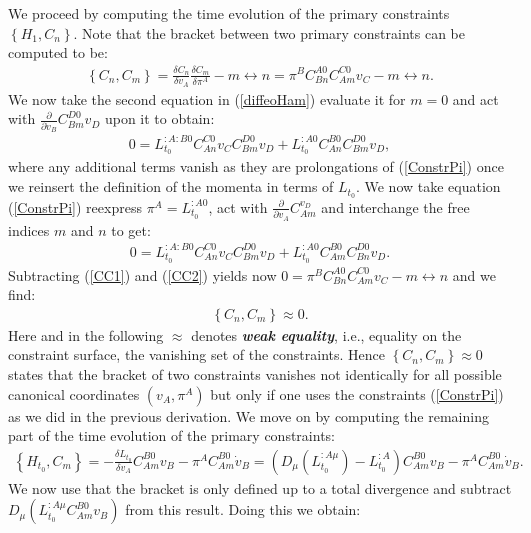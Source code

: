 We proceed by computing the time evolution of the primary constraints $\left \{ H_1, C_n \right \}$. Note that the bracket between two primary constraints can be computed to be: 
\begin{align}
    \left \{C_n, C_m \right \} = \frac{\delta C_n}{\delta v_A}\frac{\delta C_m}{\delta \pi^A} - m \leftrightarrow n = \pi^B C_{Bn}^{A0}C_{Am}^{C0} v_C - m \leftrightarrow n .
\end{align}
We now take the second equation in (\ref{diffeoHam}) evaluate it for $m=0$ and act with $\frac{\partial}{\partial \dot{v}_B}C_{Bm}^{D0}v_D$ upon it to obtain: 
\begin{align}\label{CC1}
    0 = L_{t_0}^{:A:B0}C_{An}^{C0}v_CC_{Bm}^{D0}v_D + L_{t_0}^{:A0}C_{An}^{B0}C_{Bm}^{D0}v_D,
\end{align}
where any additional terms vanish as they are prolongations of (\ref{ConstrPi}) once we reinsert the definition of the momenta in terms of $L_{t_0}$. We now take equation (\ref{ConstrPi}) reexpress $\pi^A = L_{t_0}^{:A0}$, act with $\frac{\partial}{\partial v_A}C_{Am}^{v_D}$ and interchange the free indices $m$ and $n$ to get:
\begin{align}\label{CC2}
    0 = L_{t_0}^{:A:B0}C_{An}^{C0}v_CC_{Bm}^{D0}v_D + L_{t_0}^{:A0}C_{Am}^{B0}C_{Bn}^{D0}v_D.
\end{align}
Subtracting (\ref{CC1}) and (\ref{CC2}) yields now $0=\pi^B C_{Bn}^{A0}C_{Am}^{C0} v_C - m \leftrightarrow n$ and we find:
\begin{align}
    \left \{C_n, C_m \right \} \approx 0.
\end{align}
Here and in the following $\approx$ denotes \textit{\textbf{weak equality}}, i.e., equality on the constraint surface, the vanishing set of the constraints. Hence $\left \{C_n, C_m \right \} \approx 0$ states that the bracket of two constraints vanishes not identically for all possible canonical coordinates $(v_A,\pi^A)$ but only if one uses the constraints (\ref{ConstrPi}) as we did in the previous derivation. We move on by computing the remaining part of the time evolution of the primary constraints:
\begin{align}
    \left \{H_{t_0}, C_m \right \} = -\frac{\delta L_{t_0}}{\delta v_A}C_{Am}^{B0}v_B - \pi^A C_{Am}^{B0}\dot{v}_B = (D_{\mu}(L_{t_0}^{:A\mu}) - L_{t_0}^{:A}) C_{Am}^{B0}v_B - \pi^A C_{Am}^{B0}\dot{v}_B.
\end{align}
We now use that the bracket is only defined up to a total divergence and subtract $D_{\mu}(L_{t_0}^{:A\mu} C_{Am}^{B0}v_B)$ from this result. Doing this we obtain:
